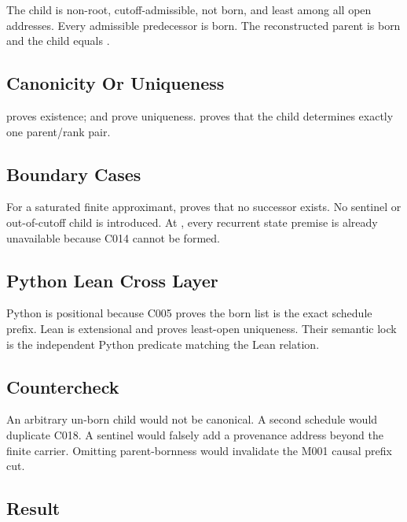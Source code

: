 The child is non-root, cutoff-admissible, not born, and least among all
open addresses. Every admissible predecessor is born. The reconstructed
parent is born and the child equals \texttt{\protect{}}.

\subsection{Canonicity Or Uniqueness}\label{canonicity-or-uniqueness-6}

\texttt{\protect{}} proves existence;
\texttt{\protect{}} and \texttt{\protect{}} prove uniqueness.
\texttt{\protect{}} proves that the child determines exactly
one parent/rank pair.

\subsection{Boundary Cases}\label{boundary-cases-6}

For a saturated finite approximant, \texttt{\protect{}}
proves that no successor exists. No sentinel or out-of-cutoff child is
introduced. At \texttt{\protect{}}, every recurrent state premise is already
unavailable because C014 cannot be formed.

\subsection{Python Lean Cross Layer}\label{python-lean-cross-layer-6}

Python is positional because C005 proves the born list is the exact
schedule prefix. Lean is extensional and proves least-open uniqueness.
Their semantic lock is the independent Python predicate matching the
Lean relation.

\subsection{Countercheck}\label{countercheck-6}

An arbitrary un-born child would not be canonical. A second schedule
would duplicate C018. A sentinel would falsely add a provenance address
beyond the finite carrier. Omitting parent-bornness would invalidate the
M001 causal prefix cut.

\subsection{Result}\label{result-15}

